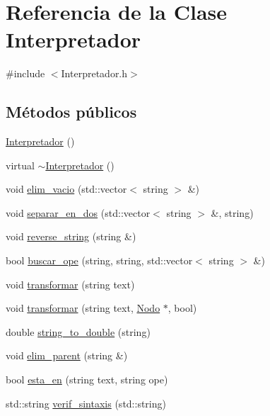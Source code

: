 \hypertarget{class_interpretador}{}\section{Referencia de la Clase Interpretador}
\label{class_interpretador}


{\ttfamily \#include $<$Interpretador.\+h$>$}

\subsection*{Métodos públicos}
\begin{DoxyCompactItemize}
\item 
\hyperlink{class_interpretador_a12d844a7ab8d634e96b57971c9aedd9e}{Interpretador} ()
\item 
virtual \hyperlink{class_interpretador_a7a3a27d4a51d961df2ad0dc5c9c67efd}{$\sim$\+Interpretador} ()
\item 
void \hyperlink{class_interpretador_a5fe0e48acd59f9e30f9a6d0b6fdc8fa2}{elim\+\_\+vacio} (std\+::vector$<$ string $>$ \&)
\item 
void \hyperlink{class_interpretador_a14fe65c1d966925c56248551d8e41d5d}{separar\+\_\+en\+\_\+dos} (std\+::vector$<$ string $>$ \&, string)
\item 
void \hyperlink{class_interpretador_ac3dba52e23ccd5f66e372562db17a0a6}{reverse\+\_\+string} (string \&)
\item 
bool \hyperlink{class_interpretador_a94fa9d2449766953dbb3806f9f8cff00}{buscar\+\_\+ope} (string, string, std\+::vector$<$ string $>$ \&)
\item 
void \hyperlink{class_interpretador_a5ad45a7156035ca33ed3cc30603c83e8}{transformar} (string text)
\item 
void \hyperlink{class_interpretador_ac096061ccb53d31d3e167994ff482992}{transformar} (string text, \hyperlink{class_nodo}{Nodo} $\ast$, bool)
\item 
double \hyperlink{class_interpretador_ac3b1cd0b89441d2f08ab721a5eb43143}{string\+\_\+to\+\_\+double} (string)
\item 
void \hyperlink{class_interpretador_a2d4e10b621a47802ba4e29eb0abd18c2}{elim\+\_\+parent} (string \&)
\item 
bool \hyperlink{class_interpretador_a70361935b6fd4bc539ed23e81b98dc4d}{esta\+\_\+en} (string text, string ope)
\item 
std\+::string \hyperlink{class_interpretador_ae91263671ef360654289dbf0e1e340ee}{verif\+\_\+sintaxis} (std\+::string)

\end{DoxyCompactItemize}
